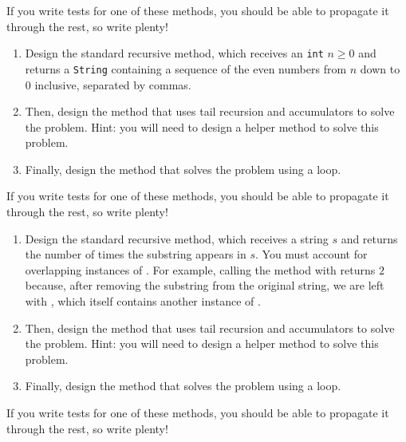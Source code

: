 If you write tests for one of these methods, you should be able to propagate it through the rest, so write plenty!

\begin{enumerate}[label=(\alph*)]
\item Design the standard recursive  method, which receives an \texttt{int} $n \geq 0$ and returns a \texttt{String} containing a sequence of the even numbers from $n$ down to $0$ inclusive, separated by commas.

\item Then, design the  method that uses tail recursion and accumulators to solve the problem. Hint: you will need to design a  helper method to solve this problem.

\item Finally, design the  method that solves the problem using a loop.
\end{enumerate}

If you write tests for one of these methods, you should be able to propagate it through the rest, so write plenty!

\begin{enumerate}[label=(\alph*)]
    \item Design the standard recursive  method, which receives a string $s$ and returns the number of times the substring  appears in $s$. You must account for overlapping instances of . For example, calling the method with  returns $2$ because, after removing the substring  from the original string, we are left with , which itself contains another instance of .

    \item Then, design the  method that uses tail recursion and accumulators to solve the problem. Hint: you will need to design a  helper method to solve this problem.

    \item Finally, design the  method that solves the problem using a loop.
\end{enumerate}

If you write tests for one of these methods, you should be able to propagate it through the rest, so write plenty!

